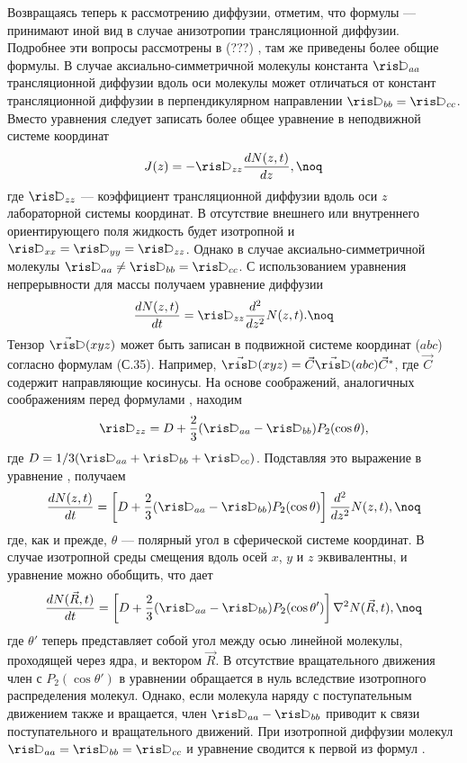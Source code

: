 {Возвращаясь теперь к рассмотрению диффузии, отметим, что формулы
 ---   принимают иной вид в случае анизотропии
трансляционной диффузии. Подробнее эти вопросы рассмотрены в
 (???) , там же приведены более общие формулы. В случае
аксиально-симметричной молекулы константа $\D_{aa}$
трансляционной диффузии вдоль оси молекулы может отличаться от
констант трансляционной диффузии в перпендикулярном направлении
$\D_{bb}=\D_{cc}$. Вместо уравнения  следует записать
более общее уравнение в неподвижной системе координат
$$J(z)=-\D_{zz}{dN(z,t)\over dz},\noq$$
где $\D_{zz}$ --- коэффициент трансляционной диффузии вдоль оси
$z$ лабораторной системы координат. В отсутствие внешнего или
внутреннего ориентирующего поля жидкость будет изотропной и
$\D_{xx}=\D_{yy}=\D_{zz}$. Однако в случае аксиально-симметричной
молекулы $\D_{aa}\not=\D_{bb}=\D_{cc}$. С использованием
уравнения непрерывности для массы получаем уравнение диффузии
$${dN(z,t)\over dt}=\D_{zz}{d^2\over dz^2}N(z,t).\noq$$
Тензор $\vec{\hbox{\D}}(xyz)$ может быть записан в подвижной системе
координат ($abc$) согласно формулам (С.35). Например,
$\vec{\hbox{\D}}(xyz)=\vec C\vec{\hbox{\D}}(abc)\vec C^*$, где $\vec C$ содержит
направляющие косинусы. На основе соображений, аналогичных
соображениям перед формулами , находим
$$\D_{zz}=D+{2\over3}(\D_{aa}-\D_{bb})P_2(\cos\theta),$$
где $D=1/3(\D_{aa}+\D_{bb}+\D_{cc})$. Подставляя это выражение в
уравнение , получаем
$${dN(z,t)\over
dt}=\left[D+{2\over3}(\D_{aa}-\D_{bb})P_2(\cos\theta)\right]{d^2\over
dz^2}N(z,t),\noq$$
где, как и прежде, $\theta$ --- полярный угол в сферической
системе координат. В случае изотропной среды смещения вдоль осей
$x$, $y$ и $z$ эквивалентны, и уравнение  можно
обобщить, что дает
$${dN(\vec R,t)\over
dt}=\left[D+{2\over3}(\D_{aa}-\D_{bb})P_2(\cos\theta')\right]\nabla^2N(\vec
R,t),\noq$$
где $\theta'$ теперь представляет собой угол между осью линейной
молекулы, проходящей через ядра, и вектором $\vec R$. В
отсутствие вращательного движения член с $P_2(\cos\theta')$ в
уравнении  обращается в нуль вследствие изотропного
распределения молекул. Однако, если молекула наряду с
поступательным движением также и вращается, член
$\D_{aa}-\D_{bb}$ приводит к связи поступательного и
вращательного движений. При изотропной диффузии молекул
$\D_{aa}=\D_{bb}=\D_{cc}$ и уравнение  сводится к первой
из формул .

}
